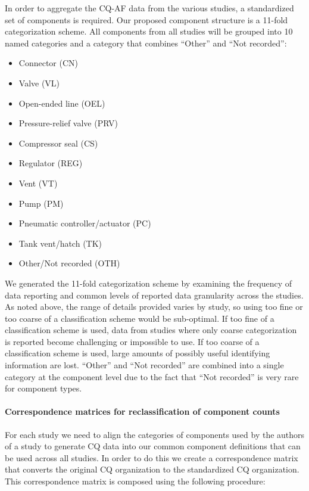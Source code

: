 \documentclass[11pt]{report}
\begin{document}
In order to aggregate the CQ-AF data from the various studies, a standardized set of components is required. Our proposed component structure is a 11-fold categorization scheme. All components from all studies will be grouped into 10 named categories and a category that combines ``Other'' and ``Not recorded'':
\begin{itemize}
\item Connector (CN)
\item Valve (VL)
\item Open-ended line (OEL)
\item Pressure-relief valve (PRV)
\item Compressor seal (CS)
\item Regulator (REG)
\item Vent (VT)
\item Pump (PM)
\item Pneumatic controller/actuator (PC)
\item Tank vent/hatch (TK)
\item Other/Not recorded (OTH)
\end{itemize}

We generated the 11-fold categorization scheme by examining the frequency of data reporting and common levels of reported data granularity across the studies. As noted above, the range of details provided varies by study, so using too fine or too coarse of a classification scheme would be sub-optimal. If too fine of a classification scheme is used, data from studies where only coarse categorization is reported become challenging or impossible to use. If too coarse of a classification scheme is used, large amounts of possibly useful identifying information are lost. ``Other'' and ``Not recorded'' are combined into a single category at the component level due to the fact that ``Not recorded'' is very rare for component types.

\paragraph{Correspondence matrices for reclassification of component counts}

For each study we need to align the categories of components used by the authors of a study to generate CQ data into our common component definitions that can be used across all studies. In order to do this we create a correspondence matrix that converts the original CQ organization to the standardized CQ organization. This correspondence matrix is composed using the following procedure:
\end{document}

